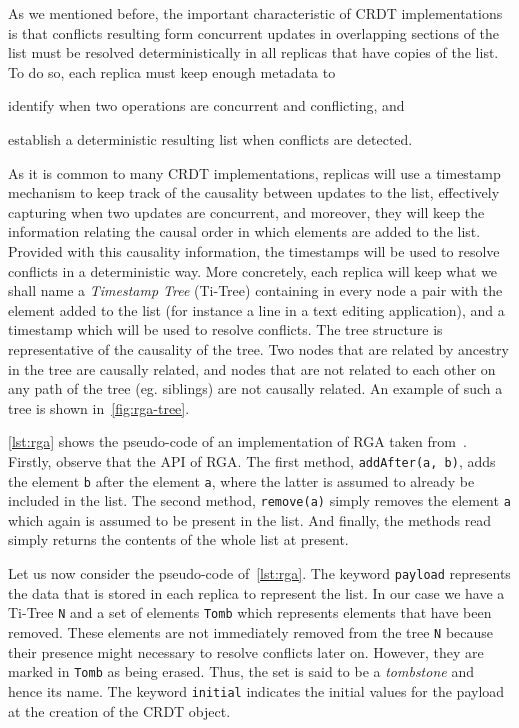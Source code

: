 As we mentioned before, the important characteristic of CRDT
implementations is that conflicts resulting form concurrent updates in
overlapping sections of the list must be resolved deterministically in
all replicas that have copies of the list.
%
To do so, each replica must keep enough metadata to
\begin{inparaenum}
\item identify when two operations are concurrent and conflicting, and
\item establish a deterministic resulting list when conflicts are detected.
\end{inparaenum}
%
As it is common to many CRDT implementations, replicas will use a
timestamp mechanism to keep track of the causality between updates to
the list, effectively capturing when two updates are concurrent, and
moreover, they will keep the information relating the causal order in
which elements are added to the list.
%
Provided with this causality information, the timestamps will be used
to resolve conflicts in a deterministic way.
%
More concretely, each replica will keep what we shall name a
\emph{Timestamp Tree} (Ti-Tree) containing in every node a pair with the
element added to the list (for instance a line in a text editing
application), and a timestamp which will be used to resolve conflicts.
The tree structure is representative of the causality of the tree.
Two nodes that are related by ancestry in the tree are causally
related, and nodes that are not related to each other on any path of
the tree (eg. siblings) are not causally related.
%
An example of such a tree is shown in~\ref{fig:rga-tree}.
%

\autoref{lst:rga} shows the pseudo-code of an implementation of RGA
taken from~\cite{}.
%
Firstly, observe that the API of RGA.
%
The first method, \lstinline|addAfter(a, b)|, adds the element
\lstinline|b| after the element \lstinline|a|, where the latter is
assumed to already be included in the list.
%
The second method, \lstinline|remove(a)| simply removes the element
\lstinline|a| which again is assumed to be present in the list.
%
And finally, the methods read simply returns the contents of the whole
list at present.

Let us now consider the pseudo-code of~\autoref{lst:rga}. 
%
The keyword \lstinline|payload| represents the data that is stored in
each replica to represent the list.
%
In our case we have a Ti-Tree \lstinline|N| and a set of elements
\lstinline|Tomb| which represents elements that have been removed.
%
These elements are not immediately removed from the tree \lstinline|N|
because their presence might necessary to resolve conflicts later on.
%
However, they are marked in \lstinline|Tomb| as being erased.
%
Thus, the set is said to be a \emph{tombstone} and hence its name.
%
The keyword \lstinline|initial| indicates the initial values for the
payload at the creation of the CRDT object.

